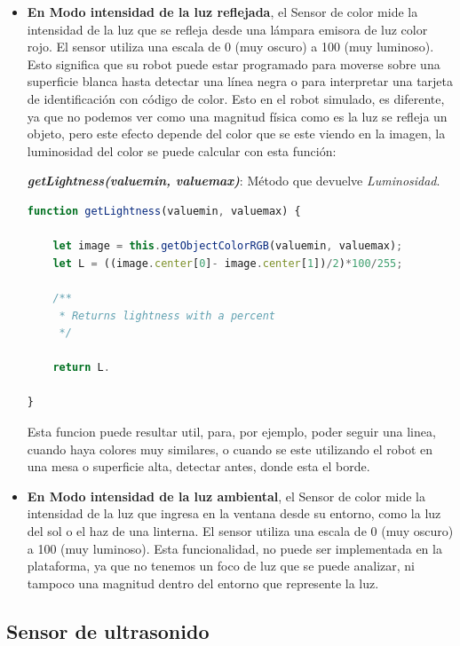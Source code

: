\begin{itemize}
\item\textbf{En Modo intensidad de la luz reflejada}, el Sensor de color mide la intensidad de la luz que se refleja desde una lámpara emisora de luz color rojo. El sensor utiliza una escala de 0 (muy oscuro) a 100 (muy luminoso). Esto significa que su robot puede estar programado para moverse sobre una superficie blanca hasta detectar una línea negra o para interpretar una tarjeta de identificación con código de color.
Esto en el robot simulado, es diferente, ya que no podemos ver como una magnitud física como es la luz se refleja un objeto, pero este efecto depende del color que se este viendo en la imagen, la luminosidad del color se puede calcular con esta función:

\textit{\textbf{getLightness(valuemin, valuemax)}}: Método que devuelve  \textit{Luminosidad}. 
    
    \begin{lstlisting}[language=javascript]
   function getLightness(valuemin, valuemax) {
    
    let image = this.getObjectColorRGB(valuemin, valuemax);
    let L = ((image.center[0]- image.center[1])/2)*100/255;
    
    /**
     * Returns lightness with a percent
     */
    
    return L.

}
\end{lstlisting}

Esta funcion puede resultar util, para, por ejemplo, poder seguir una linea, cuando haya colores muy similares, o cuando se este utilizando el robot en una mesa o superficie alta, detectar antes, donde esta el borde.

\item\textbf{En Modo intensidad de la luz ambiental}, el Sensor de color mide la intensidad de la luz que ingresa en la ventana desde su entorno, como la luz del sol o el haz de una linterna. El sensor utiliza una escala de 0 (muy oscuro) a 100 (muy luminoso). Esta funcionalidad, no puede ser implementada en la plataforma, ya que no tenemos un foco de luz que se puede analizar, ni tampoco una magnitud dentro del entorno que represente la luz.

\end{itemize}

\subsection{Sensor de ultrasonido}

